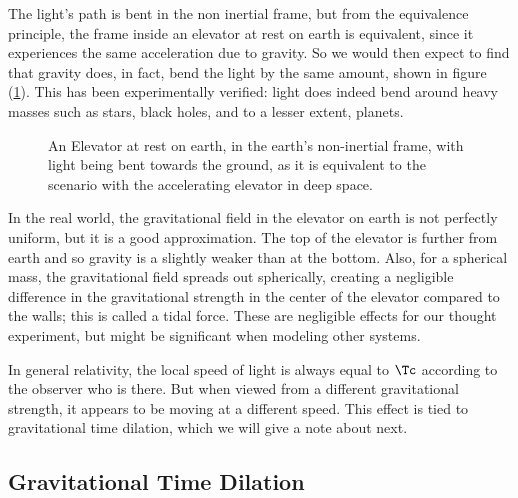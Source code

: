 The light's path is bent in the non inertial frame, but from the equivalence principle, the frame inside an elevator at rest on earth is equivalent, since it experiences the same acceleration due to gravity.
So we would then expect to find that gravity does, in fact, bend the light by the same amount, shown in figure (\ref{fig: equiv-earth}).
This has been experimentally verified: light does indeed bend around heavy masses such as stars, black holes, and to a lesser extent, planets.

\begin{figure}[htbp]
    \centering
    \caption{An Elevator at rest on earth, in the earth's non-inertial frame, with light being bent towards the ground, as it is equivalent to the scenario with the accelerating elevator in deep space.}
    \label{fig: equiv-earth}
\end{figure}

In the real world, the gravitational field in the elevator on earth is not perfectly uniform, but it is a good approximation.
The top of the elevator is further from earth and so gravity is a slightly weaker than at the bottom.
Also, for a spherical mass, the gravitational field spreads out spherically, creating a negligible difference in the gravitational strength in the center of the elevator compared to the walls; this is called a tidal force.
These are negligible effects for our thought experiment, but might be significant when modeling other systems.

In general relativity, the local speed of light is always equal to $\Tc$ according to the observer who is there. But when viewed from a different gravitational strength, it appears to be moving at a different speed.
This effect is tied to gravitational time dilation, which we will give a note about next.

\subsection{Gravitational Time Dilation}\label{subsect: Gravitational Time Dilation}

